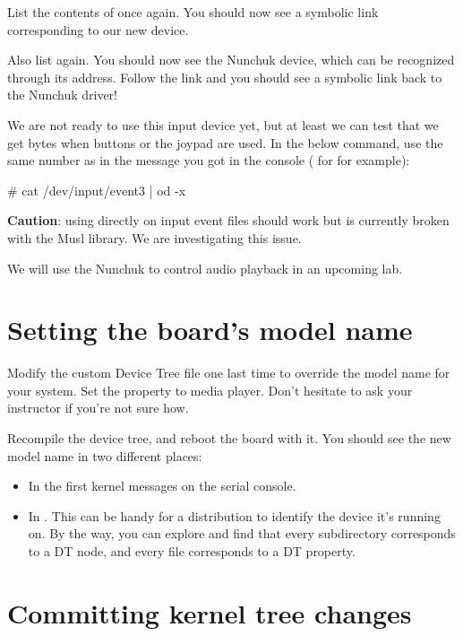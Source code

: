List the contents of  once again. You
should now see a symbolic link corresponding to our new device.

Also list  again. You should now see the
Nunchuk device, which can be recognized through its  address.
Follow the link and you should see a symbolic link back to the Nunchuk
driver!

We are not ready to use this input device yet, but at least we can test
that we get bytes when buttons or the joypad are used. In the below
command, use the same number as in the message you got in the console
( for  for example):

\begin{bashinput}
# cat /dev/input/event3 | od -x
\end{bashinput}

{\bf Caution}: using  directly on input event files should
work but is currently broken with the Musl library. We are investigating
this issue.

We will use the Nunchuk to control audio playback in an upcoming lab.

\section{Setting the board's model name}

Modify the custom Device Tree file one last time to override the model
name for your system. Set the  property to \labboard media
player. Don't hesitate to ask your instructor if you're not sure how.

Recompile the device tree, and reboot the board with it. You should see
the new model name in two different places:

\begin{itemize}
\item In the first kernel messages on the serial console.
\item In . This can be
      handy for a distribution to identify the device it's running on.
      By the way, you can explore  and
      find that every subdirectory corresponds to a DT node, and every
      file corresponds to a DT property.
\end{itemize}

\section{Committing kernel tree changes}

